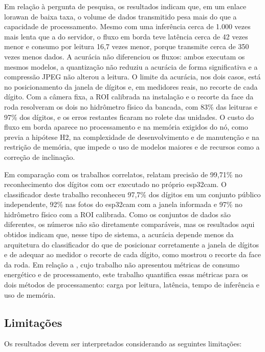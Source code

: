Em relação à pergunta de pesquisa, os resultados indicam que, em um enlace \gls{lorawan} de
baixa taxa, o volume de dados transmitido pesa mais do que a capacidade de processamento.
Mesmo com uma inferência cerca de 1.000 vezes mais lenta que a do servidor, o fluxo em borda
teve latência cerca de 42 vezes menor e consumo por leitura 16,7 vezes menor, porque
transmite cerca de 350 vezes menos dados. A acurácia não diferenciou os fluxos: ambos
executam os mesmos modelos, a quantização não reduziu a acurácia de forma significativa e a compressão JPEG não
alterou a leitura. O limite da acurácia, nos dois casos, está no posicionamento da janela de
dígitos e, em medidores reais, no recorte de cada dígito. Com a câmera fixa, a ROI
calibrada na instalação e o recorte da face da roda resolveram os dois no hidrômetro físico
da bancada, com 83\% das leituras e 97\% dos dígitos, e os erros restantes ficaram no rolete
das unidades. O custo do
fluxo em borda aparece no processamento e na memória exigidos do nó, como previa a hipótese
H2, na complexidade de desenvolvimento e de manutenção e na restrição de memória, que impede
o uso de modelos maiores e de recursos como a correção de inclinação.

Em comparação com os trabalhos correlatos,  relatam precisão de
99,71\% no reconhecimento dos dígitos com \gls{ocr} executado no próprio \gls{esp32cam}. O
classificador deste trabalho reconheceu 97,7\% dos dígitos em um conjunto público
independente, 92\% nas fotos do \gls{esp32cam} com a janela informada e 97\% no hidrômetro
físico com a ROI calibrada. Como os conjuntos de dados são diferentes, os números não são
diretamente comparáveis, mas os resultados aqui obtidos indicam que, nesse tipo de sistema,
a acurácia depende menos da arquitetura do classificador do que de posicionar corretamente a
janela de dígitos e de adequar ao medidor o recorte de cada dígito, como mostrou o recorte
da face da roda. Em relação a , cujo trabalho não
apresentou métricas de consumo energético e de processamento, este trabalho quantifica essas
métricas para os dois métodos de processamento: carga por leitura, latência, tempo de
inferência e uso de memória.

\subsection{Limitações}
\label{subsec:limitacoes_resultados}

Os resultados devem ser interpretados considerando as seguintes limitações:


